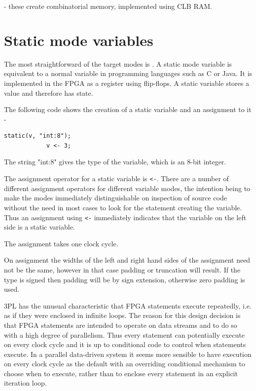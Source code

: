          - these create combinatorial memory, implemented using CLB RAM.




    \section{Static mode variables}

        The most straightforward of the target modes is . A static mode variable
        is equivalent to a normal variable in programming languages such as C or
        Java. It is implemented in the FPGA as a register using flip-flops. A static
        variable stores a value and therefore has state.

        The following code shows the creation of a static variable and an assignment
        to it -
        \begin{lstlisting}[language=threepl]
            static(v, "int:8");
            v <- 3;
        \end{lstlisting}
        The string "int:8" gives the type of the variable, which is an 8-bit integer.

        The assignment operator for a static variable is \verb'<-'. There are a number
        of different assignment operators for different variable modes, the intention
        being to make the modes immediately distinguishable on inspection of source
        code without the need in most cases to look for the statement creating
        the variable. Thus an assignment using \verb'<-' immediately indicates that
        the variable on the left side is a static variable.

        The assignment takes one clock cycle.

        On assignment the widths of the left and right hand sides of the assignment
        need not be the same, however in that case padding or truncation will result.
        If the type is signed then padding will be by sign extension, otherwise
        zero padding is used.

        3PL has the unusual characteristic that FPGA statements execute repeatedly,
        i.e. as if they were enclosed in infinite loops. The reason for this design
        decision is that FPGA statements are intended to operate on data streams
        and to do so with a high degree of parallelism. Thus every statement can
        potentially execute on every clock cycle and it is up to conditional
        code to control when statements execute. In a parallel data-driven
        system it seems more sensible to have execution on every clock cycle as
        the default with an overriding conditional mechanism to choose when to execute,
        rather than to enclose every statement in an explicit iteration loop.

